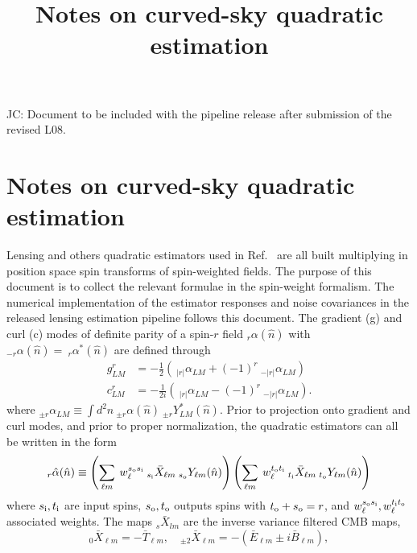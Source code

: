 \documentclass{article}
\newcommand{\si}[0]{{s_{\rm i}}}
\newcommand{\ti}[0]{{t_{\rm i}}}
\newcommand{\so}[0]{{s_{\rm o}}}
\renewcommand{\to}[0]{{t_{\rm o}}}
\newcommand{\JC}[1]{\color{red}JC: #1\color{black}}
\newcommand{\hn}[0]{\hat n}
\begin{document}
\title{Notes on curved-sky quadratic estimation}
\maketitle
\tableofcontents
\vspace{1cm}
\JC{Document to be included with the pipeline release after submission of the revised L08.}

\section{Notes on curved-sky quadratic estimation}
Lensing and others quadratic estimators used in Ref.~\cite{Aghanim:2018oex} are all built multiplying in position space spin transforms of spin-weighted fields. The purpose of this document is to collect the relevant formulae in the spin-weight formalism. The numerical implementation of the estimator responses and noise covariances in the released lensing estimation pipeline follows this document.
\newline
\newline
\noindent The gradient (g) and curl (c) modes of definite parity of a spin-$r$ field $_{r}\alpha(\hn)$ with $_{-r}\alpha(\hn) = \:_{r}\alpha^*(\hn)$ are defined through
\begin{eqnarray*}
		g^{r}_{LM} &= -\frac 12\left(\:_{|r|} \alpha_{LM} + (-1)^r \:_{-|r|} \alpha_{LM}\right)\\
		c^{r}_{LM} &=-\frac 1{2i} \left( \:_{|r|} \alpha_{LM} - (-1)^r \:_{-|r|} \alpha_{LM} \right) .
\end{eqnarray*}
where  $_{\pm r} \alpha_{LM} \equiv \int d^2n \:_{\pm r}\alpha(\hn) \:_{\pm r}Y^*_{LM}(\hn)$.
Prior to projection onto gradient and curl modes, and prior to proper normalization, the quadratic estimators can all be written in the form \begin{equation}\label{QE}
 _{r}\hat \alpha(\hn) \equiv  \left(\sum_{\ell m}\: w^{\so\si}_\ell \:_{\si} \bar X_{\ell m} \:_\so Y_{\ell m}(\hn)\right)\left(\sum_{\ell m}\:w^{\to\ti}_\ell  \:_{\ti} \bar X_{\ell m} \:_\to Y_{\ell m}(\hn)\right)
\end{equation}
where $\si, \ti$ are input spins, $\so, \to$ outputs spins with $\to + \so = r$, and $w_\ell^{\so\si}, w_\ell^{\ti\to}$ associated weights. 
\newline
\newline
The maps $_s \bar X_{lm}$ are the inverse variance filtered CMB maps,
\begin{equation}
	_0 \bar X_{\ell m} = -\bar T_{\ell m} , \quad _{\pm 2} \bar X_{\ell m} = -\left(\bar E_{\ell m} \pm i\bar B_{\ell m} \right),
\end{equation}
\end{document}
